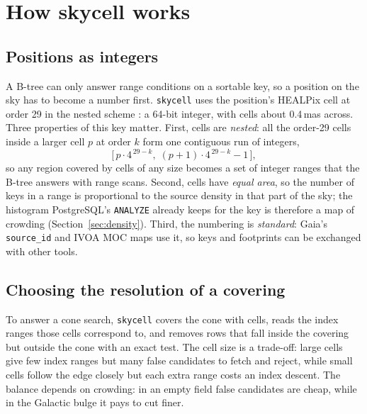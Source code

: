 \documentclass[preprint,12pt]{elsarticle}
\newcommand{\Sect}{Section}
\begin{document}
\section{How skycell works}
\label{sec:method}

\subsection{Positions as integers}
\label{sec:key}

A B-tree can only answer range conditions on a sortable key, so a position on the sky
has to become a number first. \texttt{skycell} uses the position's HEALPix cell at order
29 in the nested scheme \citep{healpix}: a 64-bit integer, with cells about 0.4\,mas
across. Three properties of this key matter. First, cells are \emph{nested}: all the
order-29 cells inside a larger cell $p$ at order $k$ form one contiguous run of
integers,
\begin{equation}
  \bigl[\, p\cdot 4^{\,29-k},\; (p+1)\cdot 4^{\,29-k} - 1 \,\bigr],
  \label{eq:interval}
\end{equation}
so any region covered by cells of any size becomes a set of integer ranges that the
B-tree answers with range scans. Second, cells have \emph{equal area}, so the number of
keys in a range is proportional to the source density in that part of the sky; the
histogram PostgreSQL's \texttt{ANALYZE} already keeps for the key is therefore a map of
crowding (\Sect~\ref{sec:density}). Third, the numbering is \emph{standard}: Gaia's
\texttt{source\_id} \citep{gaia} and IVOA MOC maps \citep{moc} use it, so keys and
footprints can be exchanged with other tools.

\subsection{Choosing the resolution of a covering}
\label{sec:cost}

To answer a cone search, \texttt{skycell} covers the cone with cells, reads the index
ranges those cells correspond to, and removes rows that fall inside the covering but
outside the cone with an exact test. The cell size is a trade-off: large cells give few index
ranges but many false candidates to fetch and reject, while small cells follow the edge
closely but each extra range costs an index descent. The balance depends on crowding:
in an empty field false candidates are cheap, while in the Galactic bulge it pays to cut
finer.
\end{document}
